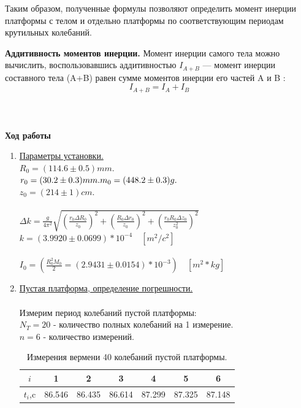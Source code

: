 \documentclass[12pt]{article}
\begin{document}
    Таким образом, полученные формулы позволяют определить момент
    инерции платформы с телом и отдельно платформы по соответствующим периодам крутильных колебаний.

    \textbf{Аддитивность моментов инерции.} Момент инерции самого тела можно вычислить, воспользовавшись аддитивностью $I_{A+B}$ — момент инерции составного тела (A+B) равен сумме моментов инерции его частей A и B :
        \begin{equation}
            I_{A+B} = I_A + I_B
        \end{equation} 
    \\ \\ \\ 
    \textbf{\large Ход работы}
    \begin{enumerate} 
        \item \underline{Параметры установки.} \\\newline
            $R_0 = (114.6 \pm 0.5)mm.$ \\ $r_0 = (30.2 \pm 0.3)mm. \\
            m_0 = (448.2 \pm 0.3)g.$ \\ $z_0 = (214 \pm 1)cm.$\\ \\
            $\Delta k = \frac{g}{4\pi^2} \sqrt{(\frac{r_0 \Delta R_0}{z_0})^2 + (\frac{R_0 \Delta r_0}{z_0})^2 
            + (\frac{r_0R_0 \Delta z_0}{z_0^2})^2}$ \\
            $ k = (3.9920 \pm 0.0699)* 10 ^ {-4} \quad [m^2 / c^2]$ \\ \\
            $I_0 = (\frac{R_0^2 M_0}{2} = (2.9431 \pm 0.0154) * 10 ^{-3}) \quad [m^2 * kg]$

        \item \underline{Пустая платформа, определение погрешности.} \\ \\
            Измерим период колебаний пустой платформы: \\
            $N_T = 20$ - количество полных колебаний на 1 измерение. \\
            $n = 6$ - количество измерений. 
            
            \begin{table}[ht]
                \caption{Измерения вермени 40 колебаний пустой платформы.}
                \begin{center}
                \begin{tabular}{|c|c|c|c|c|c|c|}
                \hline 
                $i$ & 1 & 2 & 3 & 4 & 5 & 6 \\
                \hline
                $t_i$,c & 86.546 & 86.435 & 86.614 & 87.299 & 87.325 & 87.148 \\
                \hline
                \end{tabular}
                \end{center}
            \end{table}


\end{enumerate}
\end{document}
